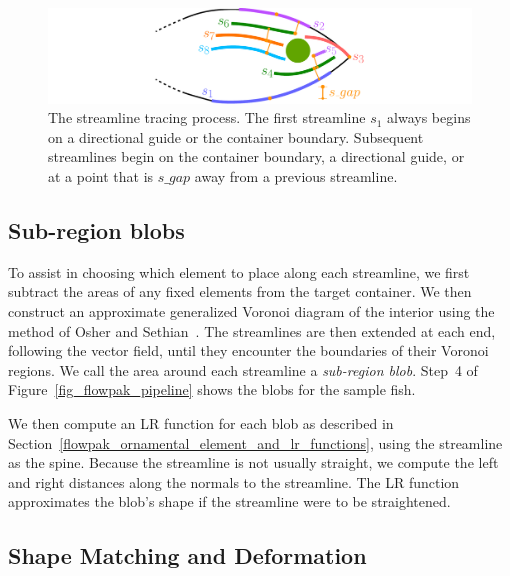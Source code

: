 \begin{figure}[h!]
\centering
\includegraphics[width=1.0\textwidth]{figures/flowpak/streamline_tracing.pdf}
\caption[The streamline tracing process]
{\label{streamline_tracing}
The streamline tracing process. The first streamline $s_1$ always begins
on a directional guide or the container boundary.  Subsequent streamlines begin
on the container boundary, a directional guide, or at a point that is 
$s\_gap$ away from a previous streamline.}
\end{figure}

\subsection{Sub-region blobs}
\label{flowpak_subregion_blobs}

To assist in choosing which element to place along each streamline, we first
subtract the areas of any fixed elements from the target container. We then
construct an approximate generalized Voronoi diagram of the interior
using the method of Osher and Sethian~\cite{Osher1988}.
The streamlines are then extended at each end, following the vector field, until
they encounter the boundaries of their Voronoi regions.
We call the area around each streamline a \textit{sub-region blob}.
Step~4 of Figure~\ref{fig_flowpak_pipeline} 
shows the blobs for the sample fish.

We then compute an LR function for each blob as described in Section~\ref{flowpak_ornamental_element_and_lr_functions},
using the streamline as the spine. Because the streamline is not usually straight, we 
compute the left and right distances along the normals to the streamline. The LR function approximates
the blob's shape if the streamline were to be straightened.

\subsection{Shape Matching and Deformation}
\label{flowpak_shape_matching_and_deformation}

